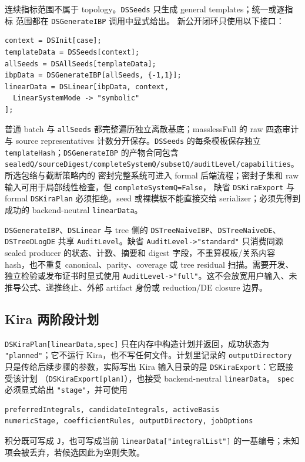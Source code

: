 ﻿\documentclass[a4paper,11pt]{article}
\begin{document}
连续指标范围不属于 topology。\texttt{DSSeeds} 只生成 general templates；统一或逐指标
范围都在 \texttt{DSGenerateIBP} 调用中显式给出。
新公开闭环只使用以下接口：
\begin{verbatim}
context = DSInit[case];
templateData = DSSeeds[context];
allSeeds = DSAllSeeds[templateData];
ibpData = DSGenerateIBP[allSeeds, {-1,1}];
linearData = DSLinear[ibpData, context,
  LinearSystemMode -> "symbolic"
];
\end{verbatim}
普通 batch 与 \texttt{allSeeds} 都完整遍历独立离散基底；masslessFull 的 raw 四态审计与 source representatives 计数分开保存。\texttt{DSSeeds} 的每条模板保存独立
\texttt{templateHash}；\texttt{DSGenerateIBP} 的产物合同包含
\texttt{sealedQ/sourceDigest/completeSystemQ/subsetQ/auditLevel/capabilities}。所选包络与截断策略内的
密封完整系统可进入 formal 后端流程；密封子集和 raw 输入可用于局部线性检查，但 \texttt{completeSystemQ=False}，
缺省 \texttt{DSKiraExport} 与 formal \texttt{DSKiraPlan} 必须拒绝。seed 或裸模板不能直接交给
serializer；必须先得到成功的 backend-neutral \texttt{linearData}。

\texttt{DSGenerateIBP}、\allowbreak\texttt{DSLinear} 与 tree 侧的
\texttt{DSTreeNaiveIBP}、\allowbreak\texttt{DSTreeNaiveDE}、\allowbreak\texttt{DSTreeDLogDE} 共享
\texttt{AuditLevel}。缺省 \texttt{AuditLevel->"standard"} 只消费同源 sealed producer 的状态、计数、摘要和 digest 字段，不重算模板/关系内容 hash，也不重复 canonical、parity、coverage 或 tree residual 扫描。需要开发、独立检验或发布证书时显式使用 \texttt{AuditLevel->"full"}。这不会放宽用户输入、未推导公式、递推终止、外部 artifact 身份或 reduction/DE closure 边界。

\subsection{Kira 两阶段计划}

\texttt{DSKiraPlan[linearData,spec]} 只在内存中构造计划并返回，成功状态为
\texttt{"planned"}；它不运行 Kira，也不写任何文件。计划里记录的 \texttt{outputDirectory}
只是传给后续步骤的参数，实际写出 Kira 输入目录的是 \texttt{DSKiraExport}：它既接受该计划
（\texttt{DSKiraExport[plan]}），也接受 backend-neutral \texttt{linearData}。
\texttt{spec} 必须显式给出 \texttt{"stage"}，并可使用
\begin{verbatim}
preferredIntegrals, candidateIntegrals, activeBasis
numericStage, coefficientRules, outputDirectory, jobOptions
\end{verbatim}
积分既可写成 \texttt{J}，也可写成当前
\texttt{linearData["integralList"]} 的一基编号；未知项会被丢弃，若候选因此为空则失败。
\end{document}
